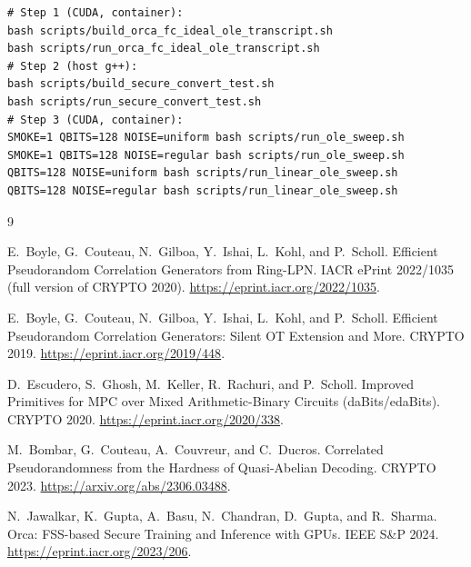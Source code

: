 \documentclass[11pt]{article}
\begin{document}
\begin{lstlisting}
# Step 1 (CUDA, container):
bash scripts/build_orca_fc_ideal_ole_transcript.sh
bash scripts/run_orca_fc_ideal_ole_transcript.sh
# Step 2 (host g++):
bash scripts/build_secure_convert_test.sh
bash scripts/run_secure_convert_test.sh
# Step 3 (CUDA, container):
SMOKE=1 QBITS=128 NOISE=uniform bash scripts/run_ole_sweep.sh
SMOKE=1 QBITS=128 NOISE=regular bash scripts/run_ole_sweep.sh
QBITS=128 NOISE=uniform bash scripts/run_linear_ole_sweep.sh
QBITS=128 NOISE=regular bash scripts/run_linear_ole_sweep.sh
\end{lstlisting}

\begin{thebibliography}{9}

E.~Boyle, G.~Couteau, N.~Gilboa, Y.~Ishai, L.~Kohl, and P.~Scholl.
\newblock Efficient Pseudorandom Correlation Generators from Ring-LPN.
\newblock IACR ePrint 2022/1035 (full version of CRYPTO 2020).
\newblock \url{https://eprint.iacr.org/2022/1035}.

E.~Boyle, G.~Couteau, N.~Gilboa, Y.~Ishai, L.~Kohl, and P.~Scholl.
\newblock Efficient Pseudorandom Correlation Generators: Silent OT Extension and
More.
\newblock CRYPTO 2019. \url{https://eprint.iacr.org/2019/448}.

D.~Escudero, S.~Ghosh, M.~Keller, R.~Rachuri, and P.~Scholl.
\newblock Improved Primitives for MPC over Mixed Arithmetic-Binary Circuits
(daBits/edaBits).
\newblock CRYPTO 2020. \url{https://eprint.iacr.org/2020/338}.

M.~Bombar, G.~Couteau, A.~Couvreur, and C.~Ducros.
\newblock Correlated Pseudorandomness from the Hardness of Quasi-Abelian
Decoding.
\newblock CRYPTO 2023. \url{https://arxiv.org/abs/2306.03488}.

N.~Jawalkar, K.~Gupta, A.~Basu, N.~Chandran, D.~Gupta, and R.~Sharma.
\newblock Orca: FSS-based Secure Training and Inference with GPUs.
\newblock IEEE S\&P 2024. \url{https://eprint.iacr.org/2023/206}.

\end{thebibliography}
\end{document}

